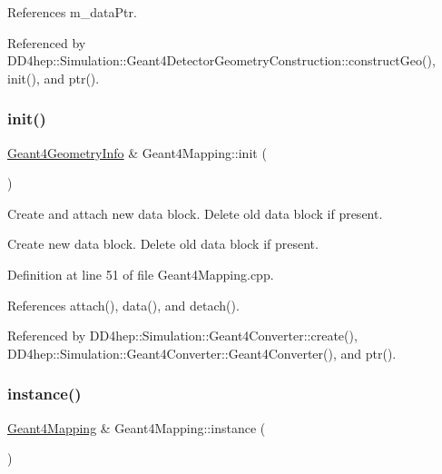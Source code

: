 References m\+\_\+data\+Ptr.



Referenced by D\+D4hep\+::\+Simulation\+::\+Geant4\+Detector\+Geometry\+Construction\+::construct\+Geo(), init(), and ptr().

\hypertarget{class_d_d4hep_1_1_simulation_1_1_geant4_mapping_a241f6e8f761d19caf370fe43fbf22015}{}\label{class_d_d4hep_1_1_simulation_1_1_geant4_mapping_a241f6e8f761d19caf370fe43fbf22015} 
\subsubsection{\texorpdfstring{init()}{init()}}
{\footnotesize\ttfamily \hyperlink{class_d_d4hep_1_1_simulation_1_1_geant4_geometry_info}{Geant4\+Geometry\+Info} \& Geant4\+Mapping\+::init (\begin{DoxyParamCaption}{ }\end{DoxyParamCaption})}



Create and attach new data block. Delete old data block if present. 

Create new data block. Delete old data block if present. 

Definition at line 51 of file Geant4\+Mapping.\+cpp.



References attach(), data(), and detach().



Referenced by D\+D4hep\+::\+Simulation\+::\+Geant4\+Converter\+::create(), D\+D4hep\+::\+Simulation\+::\+Geant4\+Converter\+::\+Geant4\+Converter(), and ptr().

\hypertarget{class_d_d4hep_1_1_simulation_1_1_geant4_mapping_affbc609db47e67ea60b84e61a41c00b6}{}\label{class_d_d4hep_1_1_simulation_1_1_geant4_mapping_affbc609db47e67ea60b84e61a41c00b6} 
\subsubsection{\texorpdfstring{instance()}{instance()}}
{\footnotesize\ttfamily \hyperlink{class_d_d4hep_1_1_simulation_1_1_geant4_mapping}{Geant4\+Mapping} \& Geant4\+Mapping\+::instance (\begin{DoxyParamCaption}{ }\end{DoxyParamCaption})\hspace{0.3cm}{\ttfamily [static]}}



